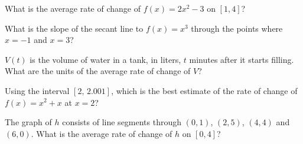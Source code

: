 \begin{exo}{}
What is the average rate of change of $f(x)=2x^2-3$ on $[1,4]$?
\end{exo}
\begin{exo}{}
What is the slope of the secant line to $f(x)=x^3$ through the points where $x=-1$ and $x=3$?
\end{exo}
\begin{exo}{}
$V(t)$ is the volume of water in a tank, in liters, $t$ minutes after it starts filling. What are the units of the average rate of change of $V$?
\end{exo}
\begin{exo}{}
Using the interval $[2,\,2.001]$, which is the best estimate of the rate of change of $f(x)=x^2+x$ at $x=2$?
\end{exo}
\begin{exo}[graph]{}
\begin{minipage}{\linewidth}
The graph of $h$ consists of line segments through $(0,1)$, $(2,5)$, $(4,4)$ and $(6,0)$. What is the average rate of change of $h$ on $[0,4]$?
\begin{center}\end{center}
\end{minipage}
\end{exo}

